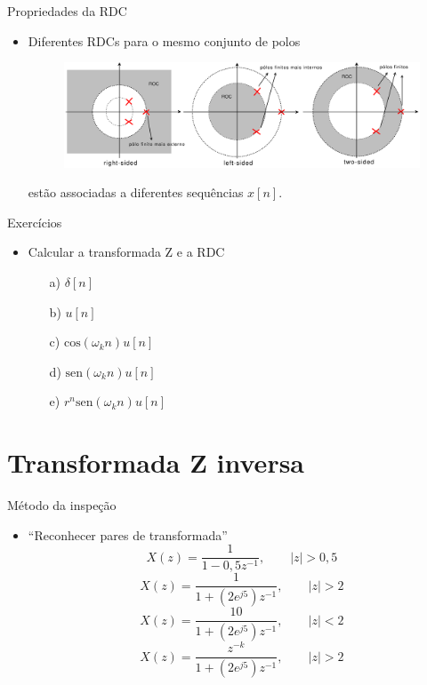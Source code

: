 \begin{slide}{Propriedades da RDC}
\begin{itemize}
   \item Diferentes RDCs para o mesmo conjunto de polos
   \begin{figure}
      \centering
      \includegraphics[width=\textwidth]{figs/p_roc.eps}
   \end{figure}
   estão associadas a diferentes sequências $x[n]$.
\end{itemize}
\end{slide}


\begin{slide}{Exercícios}
\begin{itemize}
  \item Calcular a transformada Z e a RDC
  \begin{enumerate}
     \item [a)]$\delta[n]$
     \item [b)]$u[n]$
     \item [c)]$\text{cos}(\omega_kn)u[n]$
     \item [d)]$\text{sen}(\omega_kn)u[n]$
     \item [e)]$r^n\text{sen}(\omega_kn)u[n]$
  \end{enumerate}
\end{itemize}
\end{slide}

\section[slide=true]{Transformada Z inversa}
\begin{slide}{Método da inspeção}
\begin{itemize}
   \item ``Reconhecer pares de transformada''\\
        \begin{equation*}X(z) = \frac{1}{1-0,5z^{-1}}, \qquad |z|>0,5 \end{equation*}
        \begin{equation*}X(z) = \frac{1}{1+(2e^{j5})z^{-1}}, \qquad |z|>2 \end{equation*}
        \begin{equation*}X(z) = \frac{10}{1+(2e^{j5})z^{-1}}, \qquad |z|<2 \end{equation*}
        \begin{equation*}X(z) = \frac{z^{-k}}{1+(2e^{j5})z^{-1}}, \qquad |z|>2 \end{equation*}
\end{itemize}
\end{slide}

